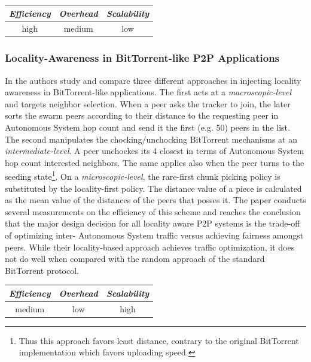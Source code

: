 \begin{center}
\begin{tabular}{ccc}
\emph{Efficiency} & \emph{Overhead} & \emph{Scalability} \\
\hline
high &
medium &
low
\end{tabular}
\end{center}

\subsubsection{Locality-Awareness in BitTorrent-like P2P Applications}
In \cite{LCLX2009} the authors study and compare three different
approaches in injecting locality awareness in BitTorrent-like applications. The
first acts at a \emph{macroscopic-level} and targets neighbor selection. When a
peer asks the tracker to join, the later sorts the swarm peers according to
their distance to the requesting peer in Autonomous System hop count and send it
the first
(e.g. 50) peers in the list. The second manipulates the chocking/unchocking
BitTorrent mechanisms at an \emph{intermediate-level}. A peer unchockes its 4
closest in terms of Autonomous System hop count interested neighbors. The same
applies also
when the peer turns to the seeding state\footnote{Thus this approach favors
least distance, contrary to the original BitTorrent implementation which favors
uploading speed.}. On a \emph{microscopic-level}, the rare-first chunk picking
policy is substituted by the locality-first policy. The distance value of a
piece is calculated as the mean value of the distances of the peers that posses
it. The paper conducts several measurements on the efficiency of this scheme 
and reaches 
the conclusion that the major design decision for all locality
aware P2P systems is the trade-off of optimizing inter- Autonomous System
traffic versus achieving fairness amongst peers.  While their
locality-based approach achieves traffic optimization, it does not do well
when compared with the 
random approach of the standard BitTorrent protocol.

\begin{center}
\begin{tabular}{ccc}
\emph{Efficiency} & \emph{Overhead} & \emph{Scalability} \\
\hline
medium &
low &
%
high
\end{tabular}
\end{center}

